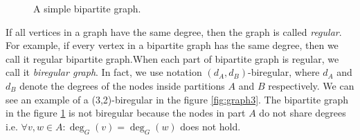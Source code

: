 \begin{figure}[h]
\centering
\caption{A simple bipartite graph.\label{fig:graph2}}
\end{figure}

If all vertices in a graph have the same degree, then the graph is called \emph{regular}.
For example, if every vertex in a bipartite graph has the same degree, then we call it regular bipartite graph.When each part of bipartite graph is regular, we call it \emph{biregular graph}.
In fact, we use notation $(d_A,d_B)$-biregular, where $d_A$ and $d_B$ denote the degrees of the nodes inside partitions $A$ and $B$ respectively.
We can see an example of a (3,2)-biregular in the figure \ref{fig:graph3}.
The bipartite graph in the figure \ref{fig:graph2} is not biregular because the nodes in part $A$ do not share degrees i.e. $\forall v, w \in A: \deg_G(v) = \deg_G(w)$ does not hold.

